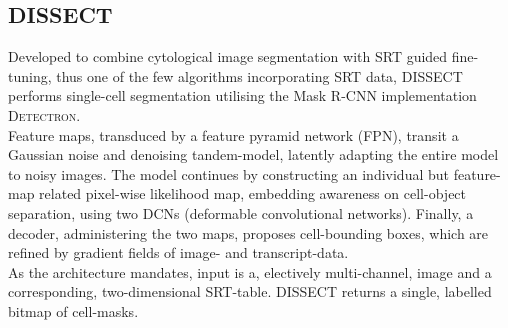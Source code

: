 \subsection*{\color{dissect}\textsc{DISSECT}}
Developed to combine cytological image segmentation with SRT guided fine-tuning, thus one of the few algorithms incorporating SRT data, \textsc{DISSECT} performs single-cell segmentation utilising the Mask R-CNN implementation \textsc{Detectron}. \cite{he_integrating_2026}\\
Feature maps, transduced by a feature pyramid network (FPN), transit a Gaussian noise and denoising tandem-model, latently adapting the entire model to noisy images. The model continues by constructing an individual but feature-map related pixel-wise likelihood map, embedding awareness on cell-object separation, using two DCNs (deformable convolutional networks). Finally, a decoder, administering the two maps, proposes cell-bounding boxes, which are refined by gradient fields of image- and transcript-data.\\
As the architecture mandates, input is a, electively multi-channel, image and a corresponding, two-dimensional SRT-table. \textsc{DISSECT} returns a single, labelled bitmap of cell-masks.
